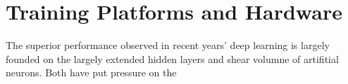 \section{Training Platforms and Hardware}
The superior performance observed in recent years' deep learning is largely founded on the largely extended hidden layers and shear volumne of artifitial neurons. Both have put pressure on the